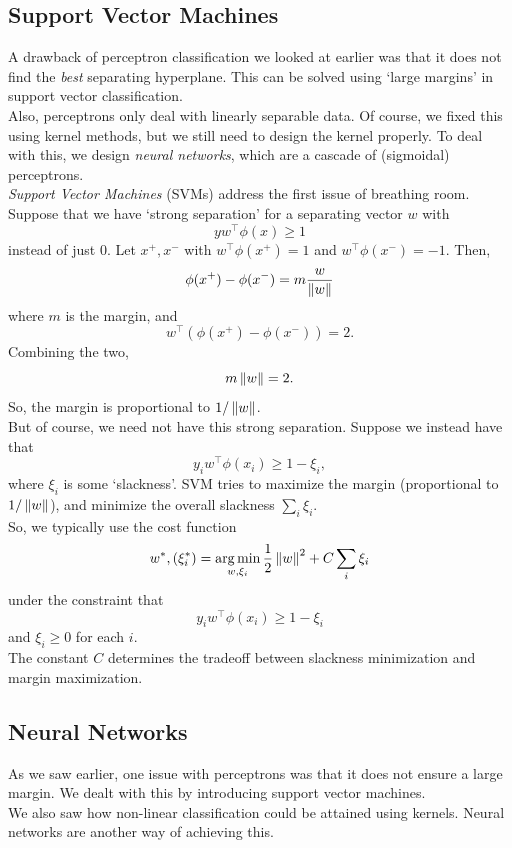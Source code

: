 \documentclass{article}
\begin{document}
	\subsection{Support Vector Machines}

		A drawback of perceptron classification we looked at earlier was that it does not find the \emph{best} separating hyperplane. This can be solved using `large margins' in support vector classification.\\
		Also, perceptrons only deal with linearly separable data. Of course, we fixed this using kernel methods, but we still need to design the kernel properly. To deal with this, we design \emph{neural networks}, which are a cascade of (sigmoidal) perceptrons.\\

		\emph{Support Vector Machines} (SVMs) address the first issue of breathing room. Suppose that we have `strong separation' for a separating vector $w$ with
		\[ yw^\top\phi(x) \ge 1 \]
		instead of just $0$. Let $x^+,x^-$ with $w^\top\phi(x^+) = 1$ and $w^\top\phi(x^-) = -1$. Then,
		\[ \phi(x^+) - \phi(x^-) = m \frac{w}{\left\lVert w\right\rVert} \]
		where $m$ is the margin, and
		\[ w^\top(\phi(x^+) - \phi(x^-)) = 2. \]
		Combining the two,
		\[ m\left\lVert w\right\rVert = 2. \]
		So, the margin is proportional to $1/\left\lVert w\right\rVert$.\\

		But of course, we need not have this strong separation. Suppose we instead have that 
		\[ y_i w^\top \phi(x_i) \ge 1 - \xi_i, \]
		where $\xi_i$ is some `slackness'. SVM tries to maximize the margin (proportional to $1/\left\lVert w\right\rVert$), and minimize the overall slackness $\sum_i \xi_i$.\\
		So, we typically use the cost function
		\[ w^*,(\xi_i^*) = \operatorname*{arg\,min}_{w,\xi_i} \frac{1}{2}\left\lVert w\right\rVert^2 + C \sum_i \xi_i \]
		under the constraint that
		\[ y_i w^\top\phi(x_i) \ge 1 - \xi_i \]
		and $\xi_i \ge 0$ for each $i$.\\
		The constant $C$ determines the tradeoff between slackness minimization and margin maximization.

	\subsection{Neural Networks}

		As we saw earlier, one issue with perceptrons was that it does not ensure a large margin. We dealt with this by introducing support vector machines.\\
		We also saw how non-linear classification could be attained using kernels. Neural networks are another way of achieving this.\\
\end{document}
